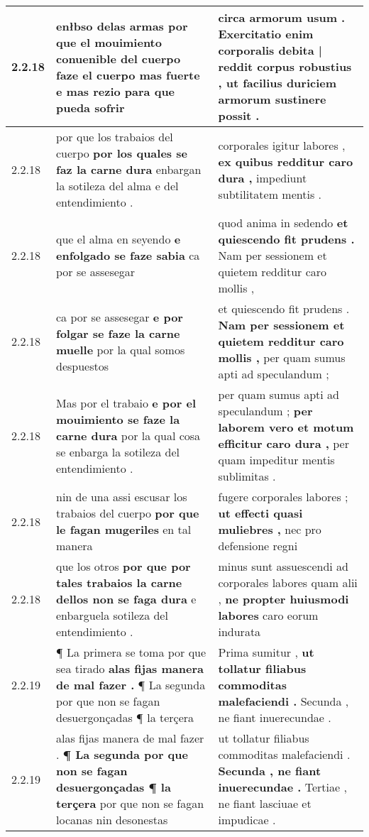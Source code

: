 \begin{tabular}{|p{1cm}|p{6.5cm}|p{6.5cm}|}
2.2.18 & enłbso delas armas \textbf{ por que el mouimiento conuenible del cuerpo faze el cuerpo mas fuerte } e mas rezio para que pueda sofrir & circa armorum usum . \textbf{ Exercitatio enim corporalis debita | reddit corpus robustius , } ut facilius duriciem armorum sustinere possit . \\\hline
2.2.18 & por que los trabaios del cuerpo \textbf{ por los quales se faz la carne dura } enbargan la sotileza del alma e del entendimiento . & corporales igitur labores , \textbf{ ex quibus redditur caro dura , } impediunt subtilitatem mentis . \\\hline
2.2.18 & que el alma en seyendo \textbf{ e enfolgado se faze sabia } ca por se assesegar & quod anima in sedendo \textbf{ et quiescendo fit prudens . } Nam per sessionem et quietem redditur caro mollis , \\\hline
2.2.18 & ca por se assesegar \textbf{ e por folgar se faze la carne muelle } por la qual somos despuestos & et quiescendo fit prudens . \textbf{ Nam per sessionem et quietem redditur caro mollis , } per quam sumus apti ad speculandum ; \\\hline
2.2.18 & Mas por el trabaio \textbf{ e por el mouimiento se faze la carne dura } por la qual cosa se enbarga la sotileza del entendimiento . & per quam sumus apti ad speculandum ; \textbf{ per laborem vero et motum efficitur caro dura , } per quam impeditur mentis sublimitas . \\\hline
2.2.18 & nin de una assi escusar los trabaios del cuerpo \textbf{ por que le fagan mugeriles } en tal manera & fugere corporales labores ; \textbf{ ut effecti quasi muliebres , } nec pro defensione regni \\\hline
2.2.18 & que los otros \textbf{ por que por tales trabaios la carne dellos non se faga dura } e enbarguela sotileza del entendimiento . & minus sunt assuescendi ad corporales labores quam alii , \textbf{ ne propter huiusmodi labores } caro eorum indurata \\\hline
2.2.19 & ¶ La primera se toma por que sea tirado \textbf{ alas fijas manera de mal fazer . } ¶ La segunda por que non se fagan desuergonçadas ¶ la terçera & Prima sumitur , \textbf{ ut tollatur filiabus commoditas malefaciendi . } Secunda , ne fiant inuerecundae . \\\hline
2.2.19 & alas fijas manera de mal fazer . \textbf{ ¶ La segunda por que non se fagan desuergonçadas ¶ la terçera } por que non se fagan locanas nin desonestas & ut tollatur filiabus commoditas malefaciendi . \textbf{ Secunda , ne fiant inuerecundae . } Tertiae , ne fiant lasciuae et impudicae . \\\hline

\end{tabular}
